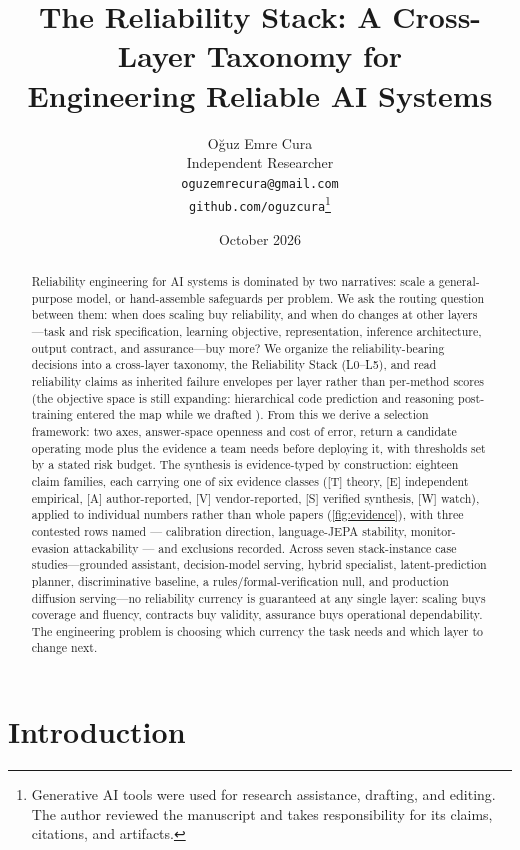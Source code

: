 \documentclass[11pt]{article}
\title{The Reliability Stack: A Cross-Layer Taxonomy for\\ Engineering Reliable AI Systems}
\author{O\u{g}uz Emre Cura\\ Independent Researcher\\ \texttt{oguzemrecura@gmail.com}\\
\texttt{github.com/oguzcura}\thanks{Generative AI tools were used for research
assistance, drafting, and editing. The author reviewed the manuscript and takes
responsibility for its claims, citations, and artifacts.}}
\date{October 2026}
\newcommand{\reliabilitystack}{Reliability Stack}
\begin{document}
\maketitle


\begin{abstract}
Reliability engineering for AI systems is dominated by two narratives: scale a general-purpose
model, or hand-assemble safeguards per problem. We ask the routing question between them: when
does scaling buy reliability, and when do changes at other layers---task and risk specification,
learning objective, representation, inference architecture, output contract, and assurance---buy
more? We organize the reliability-bearing decisions into a cross-layer taxonomy, the
\reliabilitystack{} (L0--L5), and read reliability claims as inherited failure envelopes per layer
rather than per-method scores (the objective space is still expanding: hierarchical code
prediction and reasoning post-training entered the map while we drafted \cite{kumbong2026ncm}).
From this we derive a selection framework: two axes, answer-space openness and cost of error,
return a candidate operating mode plus the evidence a team needs before deploying it, with
thresholds set by a stated risk budget. The synthesis is evidence-typed by construction: eighteen
claim families, each carrying one of six evidence classes ([T] theory, [E] independent empirical,
[A] author-reported, [V] vendor-reported, [S] verified synthesis, [W] watch), applied to
individual numbers rather than whole papers (\cref{fig:evidence}), with three contested rows named
--- calibration direction, language-JEPA stability, monitor-evasion attackability --- and
exclusions recorded. Across seven stack-instance case studies---grounded assistant, decision-model
serving, hybrid specialist, latent-prediction planner, discriminative baseline, a
rules/formal-verification null, and production diffusion serving---no reliability currency is
guaranteed at any single layer: scaling buys coverage and fluency, contracts buy validity,
assurance buys operational dependability. The engineering problem is choosing which currency the
task needs and which layer to change next.
\end{abstract}

\section{Introduction}\label{sec:intro}

\end{document}
